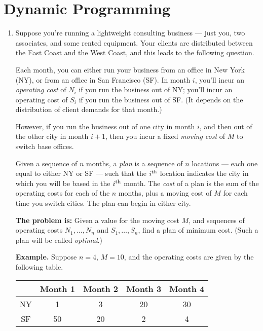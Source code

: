 \documentclass[12pt]{article}
\begin{document}
\section{Dynamic Programming}


\begin{enumerate}




\item

Suppose you're running a lightweight consulting business ---
just you, two associates, and some rented equipment.
Your clients are distributed between the East Coast and
the West Coast, and this leads to the following question.

Each month, you can either run your business from an office
in New York (NY), or from an office in San Francisco (SF).
In month $i$, you'll incur an {\em operating cost} of $N_i$
if you run the business out of NY; you'll
incur an operating cost of $S_i$
if you run the business out of SF.
(It depends on the distribution of client demands for that month.)

However, if you run the business out of one city in
month $i$, and then out of the other city in month $i + 1$,
then you incur a fixed {\em moving cost} of $M$
to switch base offices.

Given a sequence of $n$ months, a {\em plan} is
a sequence of $n$ locations --- each one equal to either NY or SF ---
such that the $i^{\rm th}$ location indicates the
city in which you will be based in the $i^{\rm th}$ month.
The {\em cost} of a plan is the sum of the operating costs
for each of the $n$ months, plus a moving cost of $M$
for each time you switch cities.
The plan can begin in either city.

{\bf The problem is:} Given a value for the moving cost $M$,
and sequences of operating costs
$N_1, \ldots, N_n$ and $S_1, \ldots, S_n$,
find a plan of minimum cost.
(Such a plan will be called {\em optimal}.)

{\bf Example.}  Suppose $n = 4$, $M = 10$, and the operating costs
are given by the following table.

\begin{table}[h]
\begin{center}
\begin{tabular}{|c||c|c|c|c|}
\hline & Month 1 & Month 2 & Month 3 & Month 4 \\ \hline
NY & 1 & 3 & 20 & 30 \\ \hline
SF & 50 & 20 & 2 & 4 \\ \hline
\end{tabular}
\end{center}
\end{table}


\end{enumerate}
\end{document}
